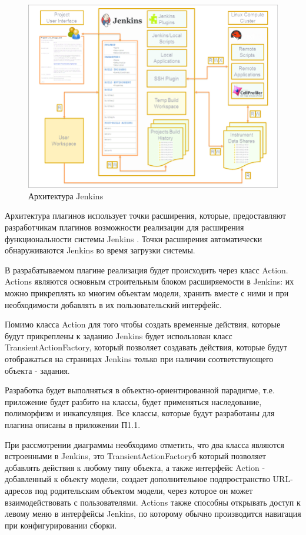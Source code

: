 \begin{figure}[ht!] 
	\center
	\includegraphics [scale=0.47] {my_folder/images//ArchitectureJenkins}
	\caption{Архитектура Jenkins \cite{article}} 
	\label{fig:ArchitectureJenkins}  
\end{figure}


Архитектура плагинов использует точки расширения, которые, предоставляют разработчикам плагинов возможности реализации для расширения функциональности системы Jenkins \cite{atchplugin}. Точки расширения автоматически обнаруживаются Jenkins во время загрузки системы.

В разрабатываемом плагине реализация будет происходить через класс Action. Actions являются основным строительным блоком расширяемости в Jenkins: их можно прикреплять ко многим объектам модели, хранить вместе с ними и при необходимости добавлять в их пользовательский интерфейс.

Помимо класса Action для того чтобы создать временные действия, которые будут прикреплены к заданию Jenkins будет использован класс TransientActionFactory, который позволяет создавать действия, которые будут отображаться на страницах Jenkins только при наличии соответствующего объекта - задания.

Разработка будет выполняться в объектно-ориентированной парадигме, т.е. приложение будет разбито на классы, будет применяться наследование, полиморфизм и инкапсуляция. Все классы, которые будут разработаны для плагина описаны в приложении П1.1. 

При рассмотрении диаграммы необходимо отметить, что два класса являются встроенными в Jenkins, это TransientActionFactoryб который позволяет добавлять действия к любому типу объекта, а также интерфейс Action - добавленный к объекту модели, создает дополнительное подпространство URL-адресов под родительским объектом модели, через которое он может взаимодействовать с пользователями. Actions также способны открывать доступ к левому меню в интерфейсы Jenkins, по которому обычно производится навигация при конфигурировании сборки.

